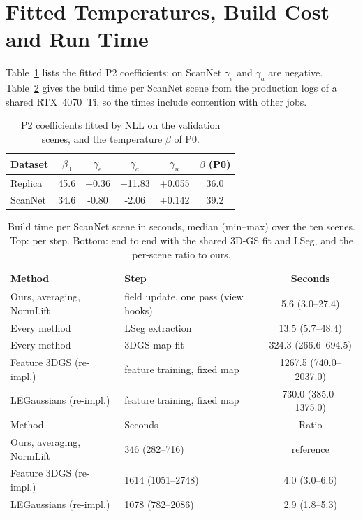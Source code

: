 \documentclass[journal]{IEEEtran}
\begin{document}
\section{Fitted Temperatures, Build Cost and Run Time}
\label{supp:cost}
Table~\ref{tab:p2} lists the fitted P2 coefficients; on ScanNet $\gamma_e$ and $\gamma_a$ are negative. Table~\ref{tab:cost} gives the build time per ScanNet scene from the production logs of a shared RTX~4070~Ti, so the times include contention with other jobs.

\begin{table}[t]
\centering
\caption{P2 coefficients fitted by NLL on the validation scenes, and the temperature $\beta$ of P0.}
\label{tab:p2}
\footnotesize
\begin{tabular}{@{}lccccc@{}}
\toprule
Dataset & $\beta_0$ & $\gamma_e$ & $\gamma_a$ & $\gamma_u$ & $\beta$ (P0)\\
\midrule
Replica & 45.6 & +0.36 & +11.83 & +0.055 & 36.0\\
ScanNet & 34.6 & -0.80 & -2.06 & +0.142 & 39.2\\
\bottomrule
\end{tabular}
\end{table}

\begin{table}[t]
\centering
\caption{Build time per ScanNet scene in seconds, median (min--max) over the ten scenes. Top: per step. Bottom: end to end with the shared 3D-GS fit and LSeg, and the per-scene ratio to ours.}
\label{tab:cost}
\footnotesize
\setlength{\tabcolsep}{3pt}
\begin{tabular}{@{}llc@{}}
\toprule
Method & Step & Seconds\\
\midrule
Ours, averaging, NormLift & field update, one pass (view hooks) & 5.6 (3.0--27.4)\\
Every method & LSeg extraction & 13.5 (5.7--48.4)\\
Every method & 3DGS map fit & 324.3 (266.6--694.5)\\
Feature 3DGS (re-impl.) & feature training, fixed map & 1267.5 (740.0--2037.0)\\
LEGaussians (re-impl.) & feature training, fixed map & 730.0 (385.0--1375.0)\\
\midrule
Method & Seconds & Ratio\\
\midrule
Ours, averaging, NormLift & 346 (282--716) & reference\\
Feature 3DGS (re-impl.) & 1614 (1051--2748) & 4.0 (3.0--6.6)\\
LEGaussians (re-impl.) & 1078 (782--2086) & 2.9 (1.8--5.3)\\
\bottomrule
\end{tabular}
\end{table}
\end{document}
